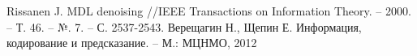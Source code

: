 \documentclass[12pt]{article}
\begin{document}

	
	\newpage
	\begin{thebibliography}{9}
	Rissanen J. MDL denoising //IEEE Transactions on Information Theory. – 2000. -- Т. 46. -- №. 7. -- С. 2537-2543.
	Верещагин Н., Щепин Е. Информация, кодирование и предсказание. -- М.: МЦНМО, 2012 \end{thebibliography}
\end{document}
